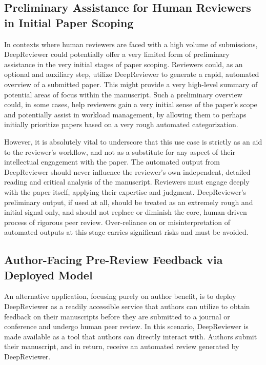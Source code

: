 \documentclass{article}
\begin{document}
\subsection{Preliminary Assistance for Human Reviewers in Initial Paper Scoping}

In contexts where human reviewers are faced with a high volume of submissions, DeepReviewer could potentially offer a very limited form of preliminary assistance in the very initial stages of paper scoping. Reviewers could, as an optional and auxiliary step, utilize DeepReviewer to generate a rapid, automated overview of a submitted paper. This might provide a very high-level summary of potential areas of focus within the manuscript. Such a preliminary overview could, in some cases, help reviewers gain a very initial sense of the paper's scope and potentially assist in workload management, by allowing them to perhaps initially prioritize papers based on a very rough automated categorization.

However, it is absolutely vital to underscore that this use case is strictly as an aid to the reviewer's workflow, and not as a substitute for any aspect of their intellectual engagement with the paper. The automated output from DeepReviewer should never influence the reviewer's own independent, detailed reading and critical analysis of the manuscript. Reviewers must engage deeply with the paper itself, applying their expertise and judgment. DeepReviewer's preliminary output, if used at all, should be treated as an extremely rough and initial signal only, and should not replace or diminish the core, human-driven process of rigorous peer review. Over-reliance on or misinterpretation of automated outputs at this stage carries significant risks and must be avoided.

\subsection{Author-Facing Pre-Review Feedback via Deployed Model}

An alternative application, focusing purely on author benefit, is to deploy DeepReviewer as a readily accessible service that authors can utilize to obtain feedback on their manuscripts before they are submitted to a journal or conference and undergo human peer review. In this scenario, DeepReviewer is made available as a tool that authors can directly interact with. Authors submit their manuscript, and in return, receive an automated review generated by DeepReviewer.
\end{document}
